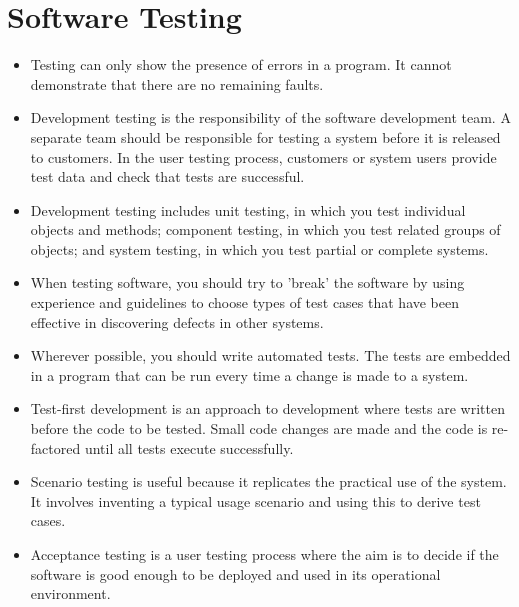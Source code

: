 \documentclass{article}
\begin{document}
\section{Software Testing}
\begin{itemize}
    \item Testing can only show the presence of errors in a program.  It cannot demonstrate that there are no remaining faults.
    \item Development testing is the responsibility of the software development team.  A separate team should be responsible for testing a system before it is released to customers.
        In the user testing process, customers or system users provide test data and check that tests are successful.
    \item Development testing includes unit testing, in which you test individual objects and methods; component testing, in which you test related groups of objects; and system testing, in which you test partial or complete systems.
    \item When testing software, you should try to 'break' the software by using experience and guidelines to choose types of test cases that have been effective in discovering defects in other systems.
    \item Wherever possible, you should write automated tests.  The tests are embedded in a program that can be run every time a change is made to a system.
    \item Test-first development is an approach to development where tests are written before the code to be tested.  Small code changes are made and the code is re-factored until all tests execute successfully.
    \item Scenario testing is useful because it replicates the practical use of the system.  It involves inventing a typical usage scenario and using this to derive test cases.
    \item Acceptance testing is a user testing process where the aim is to decide if the software is good enough to be deployed and used in its operational environment.
\end{itemize}
\end{document}
